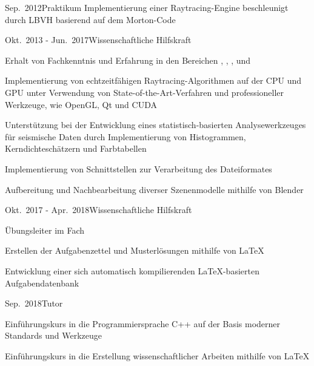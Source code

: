 \documentclass[a4paper,10pt]{cv}
\begin{document}
      \begin{cvTimeItem}{Sep.~2012}{Praktikum}
        Implementierung einer Raytracing-Engine beschleunigt durch LBVH basierend auf dem Morton-Code
      \end{cvTimeItem}
      \begin{cvTimeItem}{Okt.~2013 - Jun.~2017}{Wissenschaftliche Hilfskraft}
        \begin{cvItemize}
          \item Erhalt von Fachkenntnis und Erfahrung in den Bereichen , , ,  und 
          \item Implementierung von echtzeitfähigen Raytracing-Algorithmen auf der CPU und GPU unter Verwendung von State-of-the-Art-Verfahren und professioneller Werkzeuge, wie OpenGL, Qt und CUDA
          \item Unterstützung bei der Entwicklung eines statistisch-basierten Analysewerkzeuges für seismische Daten durch Implementierung von Histogrammen, Kerndichteschätzern und Farbtabellen
          \item Implementierung von Schnittstellen zur Verarbeitung des  Dateiformates
          \item Aufbereitung und Nachbearbeitung diverser Szenenmodelle mithilfe von Blender
        \end{cvItemize}
      \end{cvTimeItem}

      \begin{cvTimeItem}{Okt.~2017 - Apr.~2018}{Wissenschaftliche Hilfskraft}
        \begin{cvItemize}
          \item Übungsleiter im Fach 
          \item Erstellen der Aufgabenzettel und Musterlösungen mithilfe von LaTeX
          \item Entwicklung einer sich automatisch kompilierenden LaTeX-basierten Aufgabendatenbank
        \end{cvItemize}
      \end{cvTimeItem}
      \begin{cvTimeItem}{Sep.~2018}{Tutor}
        \begin{cvItemize}
          \item Einführungskurs in die Programmiersprache C++ auf der Basis moderner Standards und Werkzeuge
          \item Einführungskurs in die Erstellung wissenschaftlicher Arbeiten mithilfe von LaTeX
        \end{cvItemize}
      \end{cvTimeItem}
\end{document}

